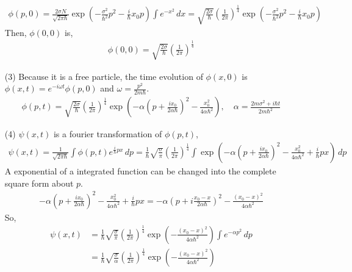 \documentclass[aps,floatfix,nofootinbib,superscriptaddress,fleqn]{revtex4}
\begin{document}
\begin{itemize}
\begin{align}
          \phi(p,0) = \frac{2\sigma N}{\sqrt{2\pi\hbar}}\exp\left(-\frac{\sigma^2}{\hbar^2}p^2-\frac{i}{\hbar}x_0p\right)\int e^{-x^2}\,dx
                    = \sqrt{\frac{2\sigma }{\hbar}}{\left(\frac{1}{2\pi}\right)}^{\frac{1}{4}}\exp\left(-\frac{\sigma^2}{\hbar^2}p^2-\frac{i}{\hbar}x_0p\right)
\end{align}
Then, $\phi(0,0)$ is,
\begin{align}
          \phi(0,0)=\sqrt{\frac{2\sigma }{\hbar}}{\left(\frac{1}{2\pi}\right)}^{\frac{1}{4}}
\end{align}
\item[(3)] Because it is a free particle, the time evolution of $\phi(x,0)$ is $\phi(x,t)=e^{-i\omega t}\phi(p,0)$ and $\omega = \frac{p^2}{2m\hbar}$.
\begin{align}
          \phi (p,t) = \sqrt{\frac{2\sigma }{\hbar}}{\left(\frac{1}{2\pi}\right)}^{\frac{1}{4}}\exp\left(-\alpha{\left(p+\frac{ix_0}{2\alpha\hbar}\right)}^2 
                      -\frac{x_0^2}{4\alpha\hbar^2}\right),
          \quad \alpha = \frac{2m\sigma^2+i\hbar t}{2m\hbar^2}
\end{align} 
\item[(4)] $\psi(x,t)$ is a fourier transformation of $\phi(p,t)$,
\begin{align}
          \psi(x,t)=\frac{1}{\sqrt{2\pi\hbar}}\int\phi(p,t) e^{\frac{i}{\hbar}px}\,dp
          =\frac{1}{\hbar} \sqrt{\frac{\sigma }{\pi}}{\left(\frac{1}{2\pi}\right)}^{\frac{1}{4}} \int \exp\left(-\alpha{\left(p+\frac{ix_0}{2\alpha\hbar}\right)}^2 
          -\frac{x_0^2}{4\alpha\hbar^2}+\frac{i}{\hbar}px\right)\,dp
\end{align} 
A exponential of a integrated function can be changed into the complete square form about $p$.
\begin{align}
          -\alpha{\left(p+\frac{ix_0}{2\alpha\hbar}\right)}^2 
          -\frac{x_0^2}{4\alpha\hbar^2}+\frac{i}{\hbar}px 
            = -\alpha{\left(p+i\frac{x_0-x}{2\alpha\hbar}\right)}^2
              -\frac{{(x_0-x)}^2}{4\alpha\hbar^2}
\end{align}
So,
\begin{align}
          \psi(x,t)&=\frac{1}{\hbar} \sqrt{\frac{\sigma }{\pi}}{\left(\frac{1}{2\pi}\right)}^{\frac{1}{4}}\exp\left(-\frac{{(x_0-x)}^2}{4\alpha\hbar^2}\right)\int e^{-\alpha p^2}\,dp
          \\&= \frac{1}{\hbar} \sqrt{\frac{\sigma }{\alpha}}{\left(\frac{1}{2\pi}\right)}^{\frac{1}{4}}\exp\left(-\frac{{(x_0-x)}^2}{4\alpha\hbar^2}\right)

\end{align}
\end{itemize}
\end{document}
